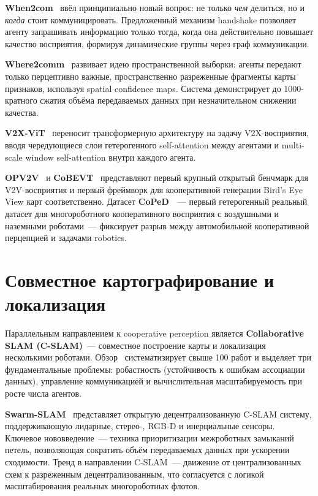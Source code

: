 \documentclass[14pt,a4paper]{extreport}
\begin{document}
\textbf{When2com}~\cite{liu2020when2com} ввёл принципиально новый вопрос: не только \textit{чем} делиться, но и \textit{когда} стоит коммуницировать. Предложенный механизм handshake позволяет агенту запрашивать информацию только тогда, когда она действительно повышает качество восприятия, формируя динамические группы через граф коммуникации.

\textbf{Where2comm}~\cite{hu2022where2comm} развивает идею пространственной выборки: агенты передают только перцептивно важные, пространственно разреженные фрагменты карты признаков, используя spatial confidence maps. Система демонстрирует до 1000-кратного сжатия объёма передаваемых данных при незначительном снижении качества.

\textbf{V2X-ViT}~\cite{xu2022v2xvit} переносит трансформерную архитектуру на задачу V2X-восприятия, вводя чередующиеся слои гетерогенного self-attention между агентами и multi-scale window self-attention внутри каждого агента.

\textbf{OPV2V}~\cite{xu2022opv2v} и \textbf{CoBEVT}~\cite{xu2022cobevt} представляют первый крупный открытый бенчмарк для V2V-восприятия и первый фреймворк для кооперативной генерации Bird's Eye View карт соответственно. Датасет \textbf{CoPeD}~\cite{zhou2024coped}~--- первый гетерогенный реальный датасет для многороботного кооперативного восприятия с воздушными и наземными роботами~--- фиксирует разрыв между автомобильной кооперативной перцепцией и задачами robotics.

\section{Совместное картографирование и локализация}

Параллельным направлением к cooperative perception является \textbf{Collaborative SLAM (C-SLAM)}~--- совместное построение карты и локализация несколькими роботами. Обзор~\cite{lajoie2022cslam} систематизирует свыше 100 работ и выделяет три фундаментальные проблемы: робастность (устойчивость к ошибкам ассоциации данных), управление коммуникацией и вычислительная масштабируемость при росте числа агентов.

\textbf{Swarm-SLAM}~\cite{lajoie2024swarmslam} представляет открытую децентрализованную C-SLAM систему, поддерживающую лидарные, стерео-, RGB-D и инерциальные сенсоры. Ключевое нововведение~--- техника приоритизации межроботных замыканий петель, позволяющая сократить объём передаваемых данных при ускорении сходимости. Тренд в направлении C-SLAM~--- движение от централизованных схем к разреженным децентрализованным, что согласуется с логикой масштабирования реальных многороботных флотов.
\end{document}

